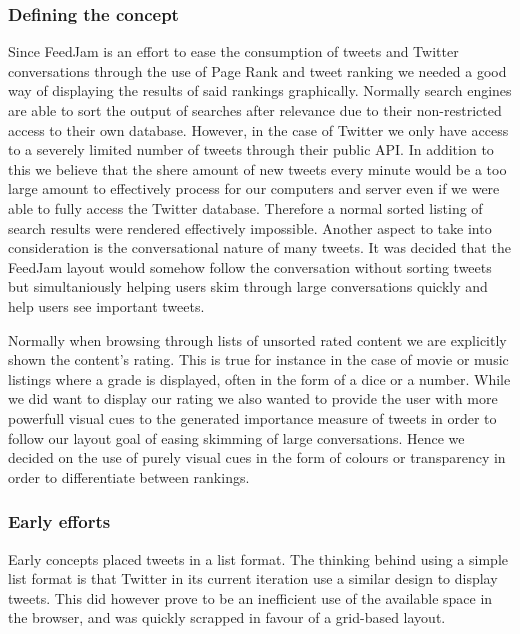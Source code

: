 \subsubsection{Defining the concept}
Since FeedJam is an effort to ease the consumption of tweets and Twitter conversations through the use of Page Rank and tweet ranking we needed a good way of displaying the results of said rankings graphically. Normally search engines are able to sort the output of searches after relevance due to their non-restricted access to their own database. However, in the case of Twitter we only have access to a severely limited number of tweets through their public API. In addition to this we believe that the shere amount of new tweets every minute would be a too large amount to effectively process for our computers and server even if we were able to fully access the Twitter database. Therefore a normal sorted listing of search results were rendered effectively impossible. Another aspect to take into consideration is the conversational nature of many tweets. It was decided that the FeedJam layout would somehow follow the conversation without sorting tweets but simultaniously helping users skim through large conversations quickly and help users see important tweets.

Normally when browsing through lists of unsorted rated content we are explicitly shown the content's rating. This is true for instance in the case of movie or music listings where a grade is displayed, often in the form of a dice or a number. While we did want to display our rating we also wanted to provide the user with more powerfull visual cues to the generated importance measure of tweets in order to follow our layout goal of easing skimming of large conversations. Hence we decided on the use of purely visual cues in the form of colours or transparency in order to differentiate between rankings.

\subsubsection{Early efforts}
Early concepts placed tweets in a list format. The thinking behind using a simple list format is that Twitter in its current iteration use a similar design to display tweets. This did however prove to be an inefficient use of the available space in the browser, and was quickly scrapped in favour of a grid-based layout.

